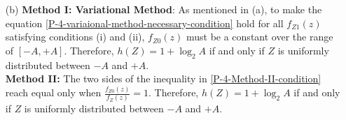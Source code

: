 \documentclass{assignment}
\begin{document}
\begin{sol}
\begin{itemize}
        \item[(b)] \textbf{Method I: Variational Method}: As mentioned in (a), to make the equation \eqref{P-4-variaional-method-necessary-condition} hold for all $f_{Z1}(z)$ satisfying conditions (i) and (ii), $f_{Z0}(z)$ must be a constant over the range of $[-A,+A]$. Therefore, $h(Z)=1+\log_2A$ if and only if $Z$ is uniformly distributed between $-A$ and $+A$.\\
        \textbf{Method II:} The two sides of the inequality in \eqref{P-4-Method-II-condition} reach equal only when $\frac{f_{Z0}(z)}{f_Z(z)}=1$. Therefore, $h(Z)=1+\log_2A$ if and only if $Z$ is uniformly distributed between $-A$ and $+A$.
    \end{itemize}
\end{sol}
\end{document}
